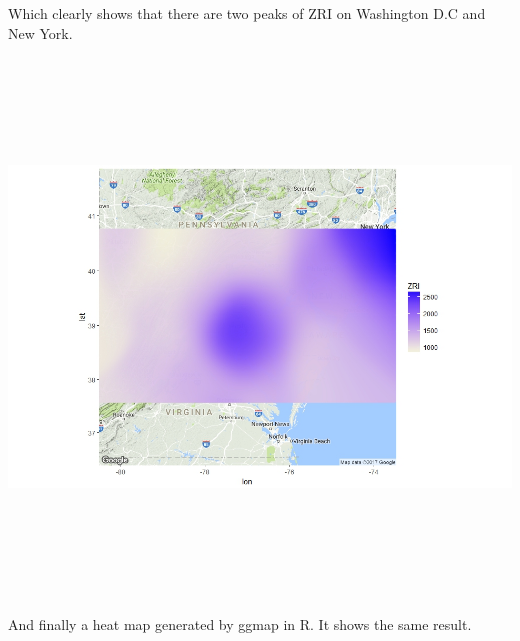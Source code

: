 \documentclass{article}
\begin{document}
Which clearly shows that there are two peaks of ZRI on Washington D.C and New York.\\
\includegraphics[width=15cm,height=15cm,keepaspectratio]{heatmap}\\
And finally a heat map generated by ggmap in R. It shows the same result.
\end{document}
